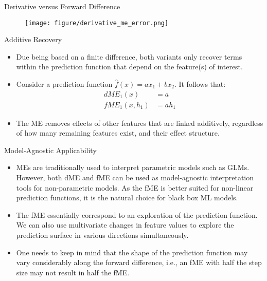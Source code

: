 \documentclass[11pt,compress,t,notes=noshow, xcolor=table]{beamer}
\begin{document}
\begin{vbframe}{Derivative versus Forward Difference}
\begin{figure}
  \texttt{[image: figure/derivative\_me\_error.png]}
\end{figure}
\end{vbframe}

\begin{vbframe}{Additive Recovery}

\begin{itemize}
\itemsep2em
\item Due being based on a finite difference, both variants only recover terms within the prediction function that depend on the feature(s) of interest.
\item Consider a prediction function $\widehat{f}(x) = ax_1 + bx_2$. It follows that:
\begin{align*}
dME_1(x) &= a \\
fME_1(x, h_1) &= ah_1
\end{align*}
\item The ME removes effects of other features that are linked additively, regardless of how many remaining features exist, and their effect structure.
\end{itemize}

\end{vbframe}


\begin{vbframe}{Model-Agnostic Applicability}

\begin{itemize}
\itemsep2em
\item MEs are traditionally used to interpret parametric models such as GLMs. However, both dME and fME can be used as model-agnostic interpretation tools for non-parametric models. As the fME is better suited for non-linear prediction functions, it is the natural choice for black box ML models.
\item The fME essentially correspond to an exploration of the prediction function. We can also use multivariate changes in feature values to explore the prediction surface in various directions simultaneously.
\item One needs to keep in mind that the shape of the prediction function may vary considerably along the forward difference, i.e., an fME with half the step size may not result in half the fME.
\end{itemize}

\end{vbframe}
\end{document}
